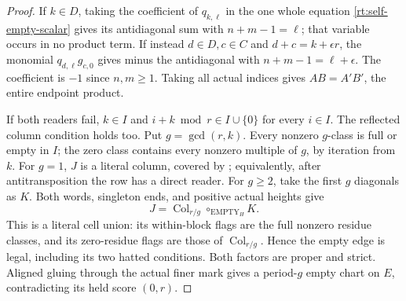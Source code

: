 \documentclass[11pt,a4paper]{amsart}
\numberwithin{equation}{section}
\theoremstyle{plain}
\theoremstyle{definition}
\newcommand{\Col}{\operatorname{Col}}
\begin{document}
\begin{proof}
If \(k\in D\), taking the coefficient of \(q_{k,\ell}\) in the one
whole equation \eqref{rt:self-empty-scalar} gives its antidiagonal
sum with \(n+m-1=\ell\); that variable occurs in no product term.
If instead \(d\in D,c\in C\) and \(d+c=k+\epsilon r\), the monomial
\(q_{d,\ell}g_{c,0}\) gives minus the antidiagonal with
\(n+m-1=\ell+\epsilon\).  The coefficient is \(-1\) since \(n,m\ge1\).
Taking all actual indices gives
\(A B=A'B'\), the entire endpoint product.

If both readers fail, \(k\in I\) and
\(i+k\bmod r\in I\cup\{0\}\) for every \(i\in I\).
The reflected column condition holds too.  Put \(g=\gcd(r,k)\).
Every nonzero \(g\)-class is full or empty in \(I\); the zero class
contains every nonzero multiple of \(g\), by iteration from \(k\).
For \(g=1\), \(J\) is a literal column, covered by
; equivalently, after antitransposition the row
has a direct reader.  For \(g\ge2\), take the first \(g\) diagonals
as \(K\).  Both words, singleton ends, and positive actual heights give
\[
 J=\Col_{r/g}\circ_{\mathrm{EMPTY}_H}K.
\]
This is a literal cell union: its within-block flags are the full
nonzero residue classes, and its zero-residue flags are those of
\(\Col_{r/g}\).  Hence the empty edge is legal, including its two
hatted conditions.  Both factors are proper and strict.  Aligned
gluing through the actual finer mark gives a period-\(g\) empty
chart on \(E\), contradicting its held score \((0,r)\).


\end{proof}
\end{document}
